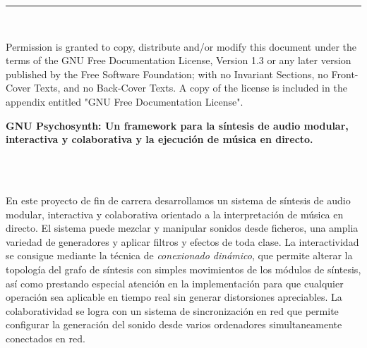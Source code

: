 



\thispagestyle{empty}
\cleardoublepage
\thispagestyle{empty}



\thispagestyle{empty}
\noindent\rule[-1ex]{\textwidth}{2pt}\\[4.5ex]
\vfill

\vspace{.5cm}

\noindent Permission is granted to copy, distribute and/or modify this
document under the terms of the GNU Free Documentation License,
Version 1.3 or any later version published by the Free Software
Foundation; with no Invariant Sections, no Front-Cover Texts, and no
Back-Cover Texts.  A copy of the license is included in the appendix
entitled "GNU Free Documentation License".


\clearpage
\thispagestyle{empty}
\begin{center}
{\large\bfseries GNU Psychosynth: Un framework para la síntesis de audio modular, interactiva y colaborativa y la ejecución de música en directo.}\\
\end{center}
\begin{center}
\myName
\end{center}
\\
\vspace{0.7cm}

\\
En este proyecto de fin de carrera desarrollamos un sistema de
síntesis de audio modular, interactiva y colaborativa orientado a la
interpretación de música en directo. El sistema puede mezclar y
manipular sonidos desde ficheros, una amplia variedad de generadores y
aplicar filtros y efectos de toda clase. La interactividad se consigue
mediante la técnica de \emph{conexionado dinámico}, que permite
alterar la topología del grafo de síntesis con simples movimientos de
los módulos de síntesis, así como prestando especial atención en la
implementación para que cualquier operación sea aplicable en tiempo
real sin generar distorsiones apreciables. La colaboratividad se logra
con un sistema de sincronización en red que permite configurar la
generación del sonido desde varios ordenadores simultaneamente
conectados en red.

